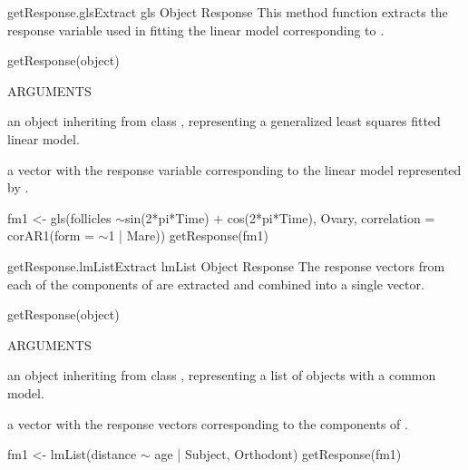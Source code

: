 \documentclass[pdftex]{article} \usepackage{url,graphicx}
\renewcommand{\Twiddle}{\mbox{\(\sim\)}}
\begin{document}
\begin{Helpfile}{getResponse.gls}{Extract gls Object Response}
This method function extracts the response variable used in fitting
the linear model corresponding to .
\begin{Example}
getResponse(object)
\end{Example}
\begin{Argument}{ARGUMENTS}
\item[\Co{object:}]
an object inheriting from class , representing
a generalized least squares fitted linear model.
\end{Argument}
a vector with the response variable corresponding to the linear
model represented by .
\need 15pt
\vspace{-16pt} 
\begin{Example}
fm1 <- gls(follicles \Twiddle sin(2*pi*Time) + cos(2*pi*Time), Ovary,
           correlation = corAR1(form = \Twiddle 1 | Mare))
getResponse(fm1)
\end{Example}
\end{Helpfile}
\begin{Helpfile}{getResponse.lmList}{Extract lmList Object Response}
The response vectors from each of the  components of
 are extracted and combined into a single vector.
\begin{Example}
getResponse(object)
\end{Example}
\begin{Argument}{ARGUMENTS}
\item[\Co{object:}]
an object inheriting from class , representing
a list of  objects with a common model.
\end{Argument}
a vector with the response vectors corresponding to the 
components of .
\need 15pt
\vspace{-16pt}
\begin{Example}
fm1 <- lmList(distance {\Twiddle} age | Subject, Orthodont)
getResponse(fm1)
\end{Example}
\end{Helpfile}
\end{document}

